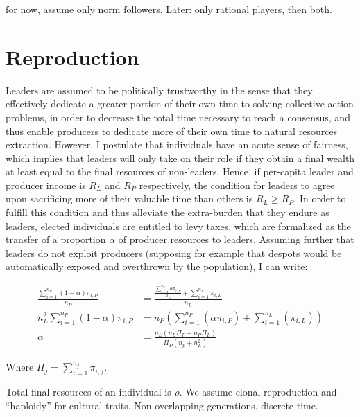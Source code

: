 \documentclass[a4paper]{article}
\begin{document}
for now, assume only norm followers. Later: only rational players, then both.

\section{Reproduction}
\label{sec:repro}

Leaders are assumed to be politically trustworthy in the sense that they effectively dedicate a greater portion of their own time to solving collective action problems, in order to decrease the total time necessary to reach a consensus, and thus enable producers to dedicate more of their own time to natural resources extraction. However, I postulate that individuals have an acute sense of fairness, which implies that leaders will only take on their role if they obtain a final wealth at least equal to the final resources of non-leaders. Hence, if per-capita leader and producer income is $R_L$ and $R_P$ respectively, the condition for leaders to agree upon sacrificing more of their valuable time than others is $R_L\ge R_P$. In order to fulfill this condition and thus alleviate the extra-burden that they endure as leaders, elected individuals are entitled to levy taxes, which are formalized as the transfer of a proportion $\alpha$ of producer resources to leaders. Assuming further that leaders do not exploit producers (supposing for example that despots would be automatically exposed and overthrown by the population), I can write:

\begin{equation}
\begin{aligned}
\frac{\sum_{i=1}^{n_P}(1-\alpha)\pi_{i,P}}{n_P} &= \frac{\frac{\sum_{i=1}^{n_P}\alpha\pi_{i,P}}{n_L}+\sum_{i=1}^{n_L}\pi_{i,L}}{n_L}\\
n_L^2 \sum_{i=1}^{n_P}(1-\alpha)\pi_{i,P} &= n_P\left(\sum_{i=1}^{n_P}(\alpha\pi_{i,P}) + \sum_{i=1}^{n_L}(\pi_{i,L})\right)\\
\alpha &= \frac{n_L\left(n_L\Pi_P+n_P\Pi_L\right)}{\Pi_P\left(n_p+n_L^2\right)}
\end{aligned}
\end{equation}   

Where $\Pi_j=\sum_{i=1}^{n_j}\pi_{i,j}$.

Total final resources of an individual is $\rho$. 
We assume clonal reproduction and ``haploidy'' for cultural traits. Non overlapping generations, discrete time.

%
%
\end{document}
